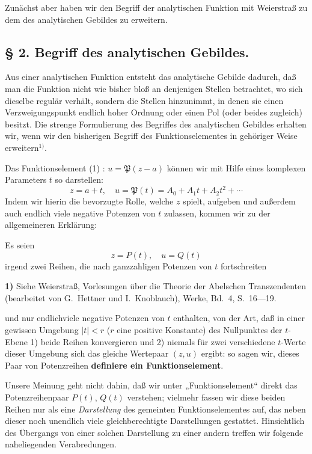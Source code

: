 \documentclass{article}
\begin{document}
Zunächst aber haben wir den Begriff der analytischen Funktion mit Weierstraß zu dem des analytischen Gebildes zu erweitern.

\subsection*{§ 2. Begriff des analytischen Gebildes.}

Aus einer analytischen Funktion entsteht das analytische Gebilde dadurch, daß man die Funktion nicht wie bisher bloß an denjenigen Stellen betrachtet, wo sich dieselbe regulär verhält, sondern die Stellen hinzunimmt, in denen sie einen Verzweigungspunkt endlich hoher Ordnung oder einen Pol (oder beides zugleich) besitzt. Die strenge Formulierung des Begriffes des analytischen Gebildes erhalten wir, wenn wir den bisherigen Begriff des Funktionselementes in gehöriger Weise erweitern${}^{1)}$.

Das Funktionselement (1) : $u = \mathfrak{P}(z - a)$ können wir mit Hilfe eines komplexen Parameters $t$ so darstellen:
\[ z = a + t, \quad u = \mathfrak{P}(t) = A_0 + A_1 t + A_2 t^2 + \cdots \]
Indem wir hierin die bevorzugte Rolle, welche $z$ spielt, aufgeben und außerdem auch endlich viele negative Potenzen von $t$ zulassen, kommen wir zu der allgemeineren Erklärung:

Es seien
\[ z = P(t), \quad u = Q(t) \]
irgend zwei Reihen, die nach ganzzahligen Potenzen von $t$ fortschreiten

\textbf{1)} Siehe Weierstraß, Vorlesungen über die Theorie der Abelschen Transzendenten (bearbeitet von G.\ Hettner und I.\ Knoblauch), Werke, Bd.\ 4, S.\ 16---19.

und nur endlichviele negative Potenzen von $t$ enthalten, von der Art, daß in einer gewissen Umgebung $|t| < r$ ($r$ eine positive Konstante) des Nullpunktes der $t$-Ebene 1) beide Reihen konvergieren und 2) niemals für zwei verschiedene $t$-Werte dieser Umgebung sich das gleiche Wertepaar $(z, u)$ ergibt: so sagen wir, dieses Paar von Potenzreihen \textbf{definiere ein Funktionselement}.

Unsere Meinung geht nicht dahin, daß wir unter „Funktionselement“ direkt das Potenzreihenpaar $P(t)$, $Q(t)$ verstehen; vielmehr fassen wir diese beiden Reihen nur als eine \emph{Darstellung} des gemeinten Funktionselementes auf, das neben dieser noch unendlich viele gleichberechtigte Darstellungen gestattet. Hinsichtlich des Übergangs von einer solchen Darstellung zu einer andern treffen wir folgende naheliegenden Verabredungen.
\end{document}
